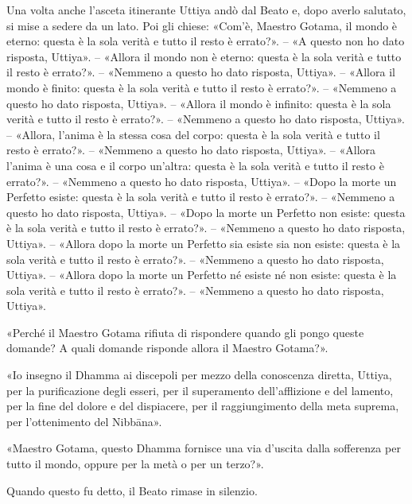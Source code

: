 
Una volta anche l’asceta itinerante Uttiya andò dal Beato e, dopo averlo
salutato, si mise a sedere da un lato. Poi gli chiese: «Com’è, Maestro Gotama,
il mondo è eterno: questa è la sola verità e tutto il resto è errato?». – «A
questo non ho dato risposta, Uttiya». – «Allora il mondo non è eterno: questa è
la sola verità e tutto il resto è errato?». – «Nemmeno a questo ho dato
risposta, Uttiya». – «Allora il mondo è finito: questa è la sola verità e tutto
il resto è errato?». – «Nemmeno a questo ho dato risposta, Uttiya». – «Allora il
mondo è infinito: questa è la sola verità e tutto il resto è errato?». –
«Nemmeno a questo ho dato risposta, Uttiya». – «Allora, l’anima è la stessa cosa
del corpo: questa è la sola verità e tutto il resto è errato?». – «Nemmeno a
questo ho dato risposta, Uttiya». – «Allora l’anima è una cosa e il corpo
un’altra: questa è la sola verità e tutto il resto è errato?». – «Nemmeno a
questo ho dato risposta, Uttiya». – «Dopo la morte un Perfetto esiste: questa è
la sola verità e tutto il resto è errato?». – «Nemmeno a questo ho dato
risposta, Uttiya». – «Dopo la morte un Perfetto non esiste: questa è la sola
verità e tutto il resto è errato?». – «Nemmeno a questo ho dato risposta,
Uttiya». – «Allora dopo la morte un Perfetto sia esiste sia non esiste: questa è
la sola verità e tutto il resto è errato?». – «Nemmeno a questo ho dato
risposta, Uttiya». – «Allora dopo la morte un Perfetto né esiste né non esiste:
questa è la sola verità e tutto il resto è errato?». – «Nemmeno a questo ho dato
risposta, Uttiya».

«Perché il Maestro Gotama rifiuta di rispondere quando gli pongo queste domande?
A quali domande risponde allora il Maestro Gotama?».

«Io insegno il Dhamma ai discepoli per mezzo della conoscenza diretta, Uttiya,
per la purificazione degli esseri, per il superamento dell’afflizione e del
lamento, per la fine del dolore e del dispiacere, per il raggiungimento della
meta suprema, per l’ottenimento del Nibbāna».

«Maestro Gotama, questo Dhamma fornisce una via d’uscita dalla sofferenza per
tutto il mondo, oppure per la metà o per un terzo?».

Quando questo fu detto, il Beato rimase in silenzio.

